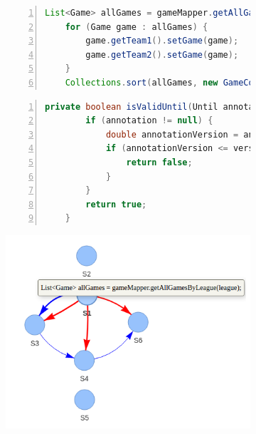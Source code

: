 \begin{figure}[hbt!]
\centering
\begin{subfigure}[b]{.4\textwidth}
\begin{lstlisting}[basicstyle=\scriptsize\sffamily, stepnumber=1, numbers=left, numbersep=-6pt, framexleftmargin=0mm, framexrightmargin=0mm, language=Java, emph={allGames}]
    List<Game> allGames = gameMapper.getAllGamesByLeague(league);
    for (Game game : allGames) {
        game.getTeam1().setGame(game);
        game.getTeam2().setGame(game);
    }
    Collections.sort(allGames, new GameComparator());
\end{lstlisting}
\end{subfigure}
\begin{subfigure}[b]{.4\textwidth}
\centering
\begin{lstlisting}[basicstyle=\scriptsize\sffamily, stepnumber=1, numbers=left, numbersep=-6pt, framexleftmargin=0mm, framexrightmargin=0mm, language=java, emph={annotationVersion}]
    private boolean isValidUntil(Until annotation) {
        if (annotation != null) {
            double annotationVersion = annotation.value();
            if (annotationVersion <= version) {
                return false;
            }
        }
        return true;
    }
\end{lstlisting}
\end{subfigure}
\begin{subfigure}[b]{.45\textwidth}
  \includegraphics[width=0.8\linewidth]{icse23-demo-figures/lst-partial.png}
  \vspace{2cm}
\end{subfigure}

\end{figure}
